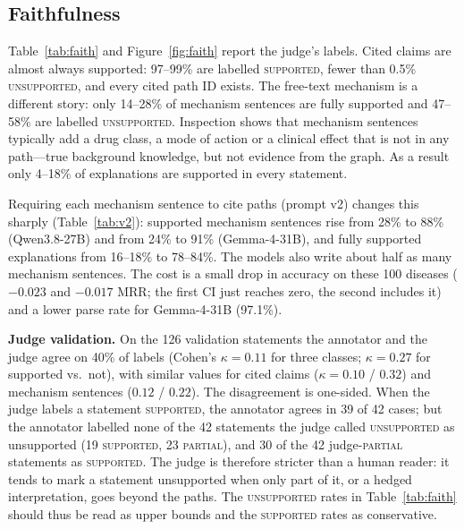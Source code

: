 \documentclass[electronics,article,submit]{Definitions/mdpi}
\begin{document}
\subsection{Faithfulness}\label{sec:faith}
Table~\ref{tab:faith} and Figure~\ref{fig:faith} report the judge's labels. Cited claims are almost always supported: 97--99\% are labelled \textsc{supported}, fewer than 0.5\% \textsc{unsupported}, and every cited path ID exists. The free-text mechanism is a different story: only 14--28\% of mechanism sentences are fully supported and 47--58\% are labelled \textsc{unsupported}. Inspection shows that mechanism sentences typically add a drug class, a mode of action or a clinical effect that is not in any path---true background knowledge, but not evidence from the graph. As a result only 4--18\% of explanations are supported in every statement.

Requiring each mechanism sentence to cite paths (prompt v2) changes this sharply (Table~\ref{tab:v2}): supported mechanism sentences rise from 28\% to 88\% (Qwen3.8-27B) and from 24\% to 91\% (Gemma-4-31B), and fully supported explanations from 16--18\% to 78--84\%. The models also write about half as many mechanism sentences. The cost is a small drop in accuracy on these 100 diseases ($-0.023$ and $-0.017$ MRR; the first CI just reaches zero, the second includes it) and a lower parse rate for Gemma-4-31B (97.1\%).

\textbf{Judge validation.} On the 126 validation statements the annotator and the judge agree on 40\% of labels (Cohen's $\kappa = 0.11$ for three classes; $\kappa = 0.27$ for supported vs.\ not), with similar values for cited claims ($\kappa = 0.10$ / $0.32$) and mechanism sentences ($0.12$ / $0.22$). The disagreement is one-sided. When the judge labels a statement \textsc{supported}, the annotator agrees in 39 of 42 cases; but the annotator labelled none of the 42 statements the judge called \textsc{unsupported} as unsupported (19 \textsc{supported}, 23 \textsc{partial}), and 30 of the 42 judge-\textsc{partial} statements as \textsc{supported}. The judge is therefore stricter than a human reader: it tends to mark a statement unsupported when only part of it, or a hedged interpretation, goes beyond the paths. The \textsc{unsupported} rates in Table~\ref{tab:faith} should thus be read as upper bounds and the \textsc{supported} rates as conservative.
\end{document}
